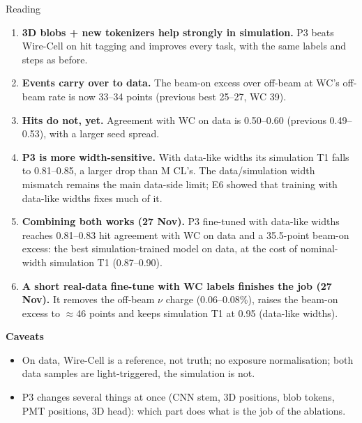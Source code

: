 \documentclass[aspectratio=169,10pt]{beamer}
\begin{document}
\begin{frame}{Reading}
  \footnotesize
  \begin{enumerate}\setlength{\itemsep}{6pt}
    \item \textbf{3D blobs + new tokenizers help strongly in simulation.} P3 beats Wire-Cell on hit tagging and improves every task, with the
      same labels and steps as before.
    \item \textbf{Events carry over to data.} The beam-on excess over off-beam at WC's off-beam rate is now 33--34 points (previous best 25--27,
      WC 39).
    \item \textbf{Hits do not, yet.} Agreement with WC on data is 0.50--0.60 (previous 0.49--0.53), with a larger seed spread.
    \item \textbf{P3 is more width-sensitive.} With data-like widths its simulation T1 falls to 0.81--0.85, a larger drop than M CL's. The
      data/simulation width mismatch remains the main data-side limit; E6 showed that training with data-like widths fixes much of it.
    \item \textbf{Combining both works (27 Nov).} P3 fine-tuned with data-like widths reaches 0.81--0.83 hit agreement with WC on data and a
      35.5-point beam-on excess: the best simulation-trained model on data, at the cost of nominal-width simulation T1 (0.87--0.90).
    \item \textbf{A short real-data fine-tune with WC labels finishes the job (27 Nov).} It removes the off-beam $\nu$ charge (0.06--0.08\%),
      raises the beam-on excess to $\approx$46 points and keeps simulation T1 at 0.95 (data-like widths).
  \end{enumerate}
  \vspace{4pt}
  \textbf{Caveats}
  \begin{itemize}\setlength{\itemsep}{2pt}\scriptsize
    \item On data, Wire-Cell is a reference, not truth; no exposure normalisation; both data samples are light-triggered, the simulation is not.
    \item P3 changes several things at once (CNN stem, 3D positions, blob tokens, PMT positions, 3D head): which part does what is the job of
      the ablations.
  \end{itemize}
\end{frame}

\end{document}
